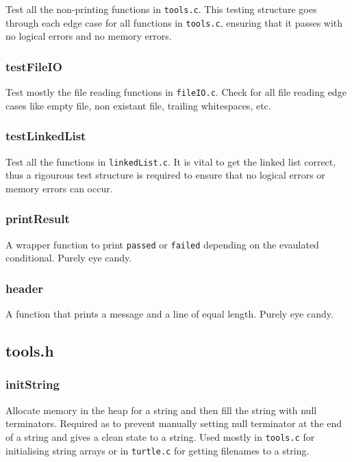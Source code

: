 \documentclass[a4paper, 12pt, titlepage]{article}
\newcommand{\code}[1]{\small\texttt{#1}\normalsize}
\begin{document}
Test all the non-printing functions in \code{tools.c}. This testing structure 
goes through each edge case for all functions in \code{tools.c}, ensuring 
that it passes with no logical errors and no memory errors.

\subsubsection{testFileIO}

Test mostly the file reading functions in \code{fileIO.c}. Check for all 
file reading edge cases like empty file, non existant file, trailing 
whitespaces, etc.

\subsubsection{testLinkedList}

Test all the functions in \code{linkedList.c}. It is vital to get the linked 
list correct, thus a rigourous test structure is required to ensure that no 
logical errors or memory errors can occur.

\subsubsection{printResult}

A wrapper function to print \code{passed} or \code{failed} depending on the 
evaulated conditional. Purely eye candy.

\subsubsection{header}

A function that prints a message and a line of equal length. Purely eye candy.

\subsection{tools.h}
\subsubsection{initString}

Allocate memory in the heap for a string and then fill the string with null 
terminators. Required as to prevent manually setting null terminator at the 
end of a string and gives a clean state to a string. Used mostly in 
\code{tools.c} for initialising string arrays or in \code{turtle.c} for 
getting filenames to a string.
\end{document}
